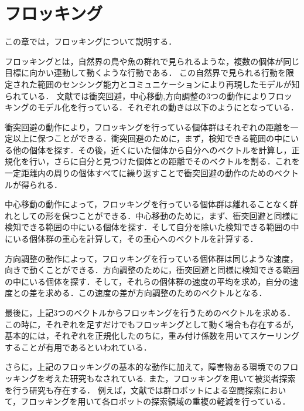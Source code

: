 \documentclass[a4paper,11pt]{jarticle}
\begin{document}
	\section{フロッキング}
	\label{sec:flocking}
	この章では，フロッキングについて説明する．
	
	フロッキングとは，自然界の鳥や魚の群れで見られるような，複数の個体が同じ目標に向かい連動して動くような行動である．
	この自然界で見られる行動を限定された範囲のセンシング能力とコミュニケーションにより再現したモデルが知られている．
	文献\cite{steering}では衝突回避，中心移動,方向調整の3つの動作によりフロッキングのモデル化を行っている．それぞれの動きは以下のようにとなっている．
	
	衝突回避の動作により，フロッキングを行っている個体群はそれぞれの距離を一定以上に保つことができる．衝突回避のために，まず，検知できる範囲の中にいる他の個体を探す．その後，近くにいた個体から自分へのベクトルを計算し，正規化を行い，さらに自分と見つけた個体との距離でそのベクトルを割る．これを一定距離内の周りの個体すべてに繰り返すことで衝突回避の動作のためのベクトルが得られる．
	
	中心移動の動作によって，フロッキングを行っている個体群は離れることなく群れとしての形を保つことができる．中心移動のために，まず、衝突回避と同様に検知できる範囲の中にいる個体を探す．そして自分を除いた検知できる範囲の中にいる個体群の重心を計算して，その重心へのベクトルを計算する．
	
	方向調整の動作によって，フロッキングを行っている個体群は同じような速度，向きで動くことができる．方向調整のために，衝突回避と同様に検知できる範囲の中にいる個体を探す．そして，それらの個体群の速度の平均を求め，自分の速度との差を求める．この速度の差が方向調整のためのベクトルとなる．
	
	最後に，上記3つのベクトルからフロッキングを行うためのベクトルを求める．この時に，それぞれを足すだけでもフロッキングとして動く場合も存在するが，基本的には，それぞれを正規化したのちに，重み付け係数を用いてスケーリングすることが有用であるといわれている．
	
	さらに，上記のフロッキングの基本的な動作に加えて，障害物ある環境でのフロッキングを考えた研究もなされている\cite{obstacle}.
	また，フロッキングを用いて被災者探索を行う研究も存在する．
	例えば，文献\cite{exploration}では群ロボットによる空間探索において，フロッキングを用いて各ロボットの探索領域の重複の軽減を行っている．	
\end{document}
